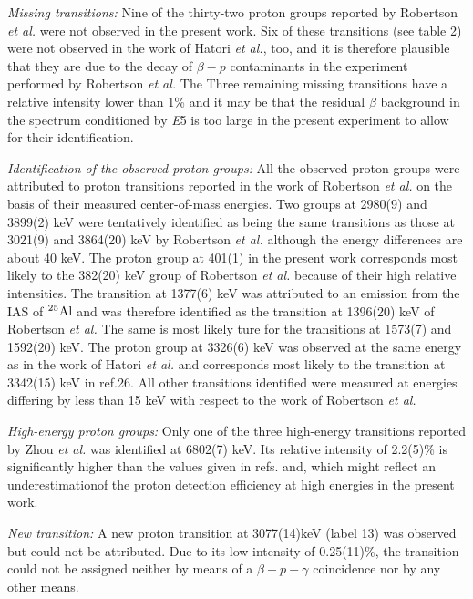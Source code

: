 \documentclass[UTF8]{ctexart}
\begin{document}
\textit{Missing transitions:} Nine of the thirty-two proton groups reported by Robertson \textit{et al.} were not observed in the present work. Six of these transitions (see table 2) were not observed in the work of Hatori \textit{et al.}, too, and it is therefore plausible that they are due to the decay of $\beta-p$ contaminants in the experiment performed by Robertson \textit{et al.} The Three remaining missing transitions have a relative intensity lower than 1\% and it may be that the residual $\beta$ background in the spectrum conditioned by \textit{E}5 is too large in the present experiment to allow for their identification.

\textit{Identification of the observed proton groups:} All the observed proton groups were attributed to proton transitions reported in the work of Robertson \textit{et al.} on the basis of their measured center-of-mass energies. Two groups at 2980(9) and 3899(2) keV were tentatively identified as being the same transitions as those at 3021(9) and 3864(20) keV by Robertson \textit{et al.} although the energy differences are about 40 keV. The proton group at 401(1) in the present work corresponds most likely to the 382(20) keV group of Robertson \textit{et al.} because of their high relative intensities. The transition at 1377(6) keV was attributed to an emission from the IAS of $^{25}\textnormal{Al}$ and was therefore identified as the transition at 1396(20) keV of Robertson \textit{et al.} The same is most likely ture for the transitions at 1573(7) and 1592(20) keV. The proton group at 3326(6) keV was observed at the same energy as in the work of Hatori \textit{et al.} and corresponds most likely to the transition at 3342(15) keV in ref.26. All other transitions identified were measured at energies differing by less than 15 keV with respect to the work of Robertson \textit{et al.}

\textit{High-energy proton groups:} Only one of the three high-energy transitions reported by Zhou \textit{et al.} was identified at 6802(7) keV. Its relative intensity of 2.2(5)\% is significantly higher than the values given in refs. and, which might reflect an underestimationof the proton detection efficiency at high energies in the present work.

\textit{New transition:} A new proton transition at 3077(14)keV (label 13) was observed but could not be attributed. Due to its low intensity of 0.25(11)\%, the transition could not be assigned neither by means of a $\beta-p-\gamma $ coincidence nor by any other means.
\end{document}
